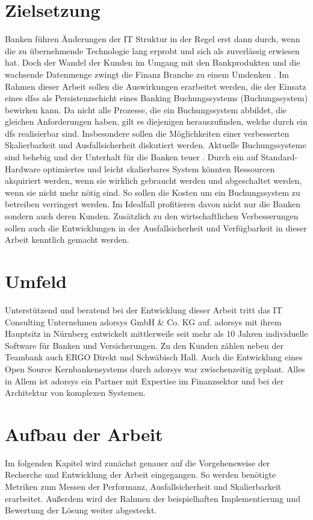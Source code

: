 \documentclass[12pt,oneside,a4paper,parskip]{scrbook}
\begin{document}
\section{Zielsetzung}

Banken führen Änderungen der IT Struktur in der Regel erst dann durch, wenn die zu übernehmende Technologie lang erprobt und sich als zuverlässig erwiesen hat. Doch der Wandel der Kunden im Umgang mit den Bankprodukten und die wachsende Datenmenge zwingt die Finanz Branche zu einem Umdenken \cite{bigdataBigStorage}. Im Rahmen dieser Arbeit sollen die Auswirkungen erarbeitet werden, die der Einsatz eines \acp{dfs} als Persistenzschicht eines Banking Buchungssystems (Buchungssystem) bewirken kann. Da nicht alle Prozesse, die ein Buchungssystem abbildet, die gleichen Anforderungen haben, gilt es diejenigen herauszufinden, welche durch ein \ac{dfs} realisierbar sind. Insbesondere sollen die Möglichkeiten einer verbesserten Skalierbarkeit und Ausfallsicherheit diskutiert werden. Aktuelle Buchungssysteme sind behebig und der Unterhalt für die Banken teuer \cite{bankingsCosts}. Durch ein auf Standard-Hardware optimiertes und leicht skalierbares System könnten Ressourcen akquiriert werden, wenn sie wirklich gebraucht werden und abgeschaltet werden, wenn sie nicht mehr nötig sind. So sollen die Kosten um ein Buchungssystem zu betreiben verringert werden. Im Idealfall profitieren davon nicht nur die Banken sondern auch deren Kunden. Zusätzlich zu den wirtschaftlichen Verbesserungen sollen auch die Entwicklungen in der Ausfallsicherheit und Verfügbarkeit in dieser Arbeit kenntlich gemacht werden.

\section{Umfeld}
Unterstützend und beratend bei der Entwicklung dieser Arbeit tritt das IT Consulting Unternehmen adorsys GmbH \& Co. KG auf. adorsys mit ihrem Hauptsitz in Nürnberg entwickelt mittlerweile seit mehr als 10 Jahren individuelle Software für Banken und Versicherungen. Zu den Kunden zählen neben der Teambank auch ERGO Direkt und Schwäbisch Hall. Auch die Entwicklung eines Open Source Kernbankensystems durch adorsys war zwischenzeitig geplant. Alles in Allem ist adorsys ein Partner mit Expertise im Finanzsektor und bei der Architektur von komplexen Systemen.

\section{Aufbau der Arbeit}
Im folgenden Kapitel wird zunächst genauer auf die Vorgehensweise der Recherche und Entwicklung der Arbeit eingegangen. So werden benötigte Metriken zum Messen der Performanz, Ausfallsicherheit und Skalierbarkeit erarbeitet. Außerdem wird der Rahmen der beispielhaften Implementierung und Bewertung der Lösung weiter abgesteckt.
\end{document}
